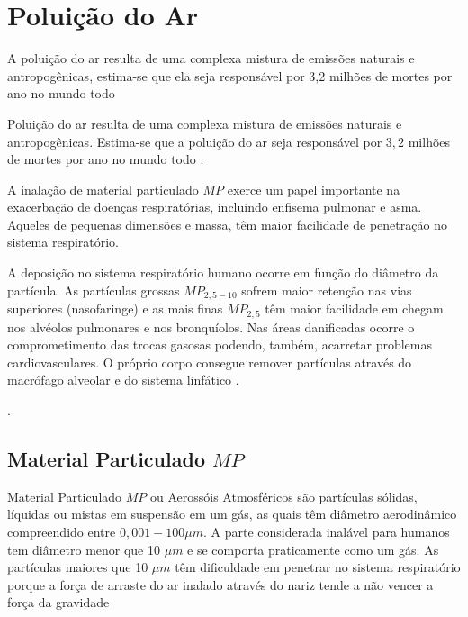 \section{Poluição do Ar}

A poluição do ar resulta de uma complexa mistura de emissões naturais e 
antropogênicas, estima-se que ela seja responsável por 3,2 milhões de mortes 
por ano no mundo todo \citep{lim2013}

Poluição do ar resulta de uma complexa mistura de emissões naturais e 
antropogênicas. Estima-se que a poluição do ar seja responsável por 
$3,2$ milhões de mortes por ano no mundo todo \citep{lim2013}.%

A inalação de material particulado $MP$ exerce um papel importante na 
exacerbação de doenças respiratórias, incluindo enfisema pulmonar e asma. 
Aqueles de pequenas dimensões e massa, têm maior facilidade de penetração no sistema 
respiratório. 

A deposição no sistema respiratório humano ocorre em função do diâmetro da 
partícula.
As partículas grossas $MP_{2,5-10}$ sofrem maior retenção nas vias superiores (nasofaringe) e
as mais finas $MP_{2,5}$ têm maior facilidade em chegam nos alvéolos pulmonares e 
nos bronquíolos.
Nas áreas danificadas ocorre o comprometimento das trocas gasosas podendo, 
também, acarretar problemas cardiovasculares.
O próprio corpo consegue remover partículas através do macrófago alveolar 
e do sistema linfático \citep{arbex2012}.

. 



\subsection{Material Particulado $MP$}

Material Particulado $MP$ ou Aerossóis Atmosféricos são partículas
sólidas, líquidas ou mistas em suspensão em um gás, as quais têm diâmetro 
aerodinâmico compreendido  entre $0,001-100\mu m$. 
A parte considerada inalável para humanos tem diâmetro menor que 10 $\mu m$
e se comporta praticamente como um gás.
As partículas maiores que 10 $\mu m$ têm dificuldade em penetrar 
no sistema respiratório porque a força de arraste do ar inalado 
através do nariz tende a não vencer a força da gravidade \citep{seinfeld2012}


